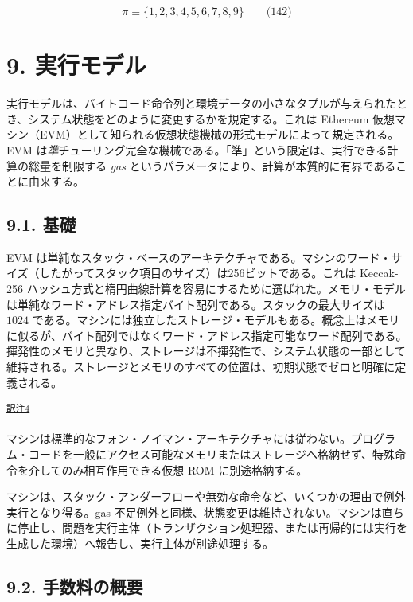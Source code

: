 \documentclass[
]{ltjsarticle}
\begin{document}
\[\pi \equiv \{1, 2, 3, 4, 5, 6, 7, 8, 9 \} \qquad \text{(142)}\]

\protect\hypertarget{ch:model}{}{}

\hypertarget{ux5b9fux884cux30e2ux30c7ux30eb}{%
\section{9. 実行モデル}\label{ux5b9fux884cux30e2ux30c7ux30eb}}

実行モデルは、バイトコード命令列と環境データの小さなタプルが与えられたとき、システム状態をどのように変更するかを規定する。これは
Ethereum
仮想マシン（EVM）として知られる仮想状態機械の形式モデルによって規定される。EVM
は\emph{準}チューリング完全な機械である。「準」という限定は、実行できる計算の総量を制限する
\emph{gas}
というパラメータにより、計算が本質的に有界であることに由来する。

\hypertarget{ux57faux790e}{%
\subsection{9.1. 基礎}\label{ux57faux790e}}

EVM
は単純なスタック・ベースのアーキテクチャである。マシンのワード・サイズ（したがってスタック項目のサイズ）は256ビットである。これは
Keccak-256
ハッシュ方式と楕円曲線計算を容易にするために選ばれた。メモリ・モデルは単純なワード・アドレス指定バイト配列である。スタックの最大サイズは
\(1024\)
である。マシンには独立したストレージ・モデルもある。概念上はメモリに似るが、バイト配列ではなくワード・アドレス指定可能なワード配列である。揮発性のメモリと異なり、ストレージは不揮発性で、システム状態の一部として維持される。ストレージとメモリのすべての位置は、初期状態でゼロと明確に定義される。

\protect\hypertarget{tnref-4}{}{}\textsuperscript{\protect\hyperlink{tn-4}{訳注4}}

マシンは標準的なフォン・ノイマン・アーキテクチャには従わない。プログラム・コードを一般にアクセス可能なメモリまたはストレージへ格納せず、特殊命令を介してのみ相互作用できる仮想
ROM に別途格納する。

マシンは、スタック・アンダーフローや無効な命令など、いくつかの理由で例外実行となり得る。gas
不足例外と同様、状態変更は維持されない。マシンは直ちに停止し、問題を実行主体（トランザクション処理器、または再帰的には実行を生成した環境）へ報告し、実行主体が別途処理する。

\hypertarget{ux624bux6570ux6599ux306eux6982ux8981}{%
\subsection{9.2.
手数料の概要}\label{ux624bux6570ux6599ux306eux6982ux8981}}
\end{document}
